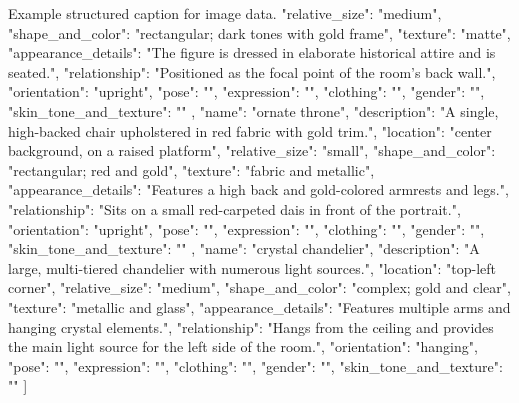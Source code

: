 \begin{captionexample}{Example structured caption for image data.}
{{      "relative_size": "medium",
      "shape_and_color": "rectangular; dark tones with gold frame",
      "texture": "matte",
      "appearance_details": "The figure is dressed in elaborate historical attire and is seated.",
      "relationship": "Positioned as the focal point of the room's back wall.",
      "orientation": "upright",
      "pose": "",
      "expression": "",
      "clothing": "",
      "gender": "",
      "skin_tone_and_texture": ""
    },
    {
      "name": "ornate throne",
      "description": "A single, high-backed chair upholstered in red fabric with gold trim.",
      "location": "center background, on a raised platform",
      "relative_size": "small",
      "shape_and_color": "rectangular; red and gold",
      "texture": "fabric and metallic",
      "appearance_details": "Features a high back and gold-colored armrests and legs.",
      "relationship": "Sits on a small red-carpeted dais in front of the portrait.",
      "orientation": "upright",
      "pose": "",
      "expression": "",
      "clothing": "",
      "gender": "",
      "skin_tone_and_texture": ""
    },
    {
      "name": "crystal chandelier",
      "description": "A large, multi-tiered chandelier with numerous light sources.",
      "location": "top-left corner",
      "relative_size": "medium",
      "shape_and_color": "complex; gold and clear",
      "texture": "metallic and glass",
      "appearance_details": "Features multiple arms and hanging crystal elements.",
      "relationship": "Hangs from the ceiling and provides the main light source for the left side of the room.",
      "orientation": "hanging",
      "pose": "",
      "expression": "",
      "clothing": "",
      "gender": "",
      "skin_tone_and_texture": ""
    }
  ]
}
\end{captionexample}

